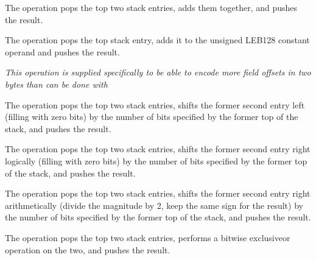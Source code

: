 \begin{enumerate}[1. ]
\itembfnl{\DWOPplusTARG}
The \DWOPplusTARG{} operation pops the top two stack entries,
adds them together, and pushes the result.

\itembfnl{\DWOPplusuconstTARG}
The \DWOPplusuconstTARG{} operation pops the top stack entry,
adds it to the unsigned LEB128
constant operand and pushes the result.

\textit{This operation is supplied specifically to be
able to encode more field offsets in two bytes than can be
done with
}

\itembfnl{\DWOPshlTARG}
The \DWOPshlTARG{} operation pops the top two stack entries,
shifts the former second entry left (filling with zero bits)
by the number of bits specified by the former top of the stack,
and pushes the result.

\itembfnl{\DWOPshrTARG}
The \DWOPshrTARG{} operation pops the top two stack entries,
shifts the former second entry right logically (filling with
zero bits) by the number of bits specified by the former top
of the stack, and pushes the result.

\itembfnl{\DWOPshraTARG}
The \DWOPshraTARG{} operation pops the top two stack entries,
shifts the former second entry right arithmetically (divide
the magnitude by 2, keep the same sign for the result) by
the number of bits specified by the former top of the stack,
and pushes the result.

\itembfnl{\DWOPxorTARG}
The \DWOPxorTARG{} operation pops the top two stack entries,
performs a bitwise exclusive\dash or operation on the two, and
pushes the result.

\end{enumerate}

